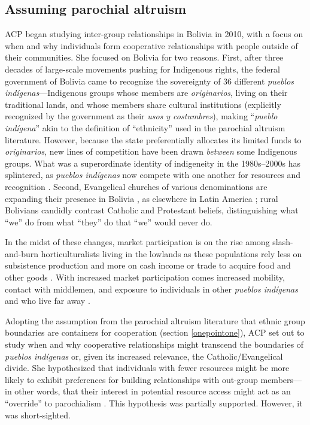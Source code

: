 \documentclass[bibauthoryear]{aa}
\begin{document}
\subsection{Assuming parochial altruism}
ACP began studying inter-group relationships in Bolivia in 2010, with a focus on when and why   individuals form cooperative relationships with people outside of their communities.   She focused on Bolivia for two reasons. First, after three decades of large-scale movements pushing for Indigenous rights, the federal government of Bolivia came to recognize the sovereignty of 36 different  \textit{pueblos ind\'igenas}---Indigenous groups whose members are \textit{originarios}, living on their traditional lands, and whose members share cultural institutions (explicitly recognized by the government as their  \textit{usos y costumbres}), making ``\textit{pueblo ind\'igena}'' akin to the definition of ``ethnicity'' used in the parochial altruism literature. However, because the state preferentially allocates its limited funds to \textit{originarios}, new lines of competition have been drawn \textit{between} some Indigenous groups. What was a superordinate identity of indigeneity in the 1980s--2000s has splintered, as \textit{pueblos ind\'igenas} now compete with one another for resources and recognition \citep{fontana2014indigenous}.
Second, Evangelical churches of various denominations are expanding their presence in Bolivia \citep{lesley1993religious}, as elsewhere in Latin America \citep{stoll1990latin}; rural Bolivians candidly contrast Catholic and Protestant beliefs, distinguishing what ``we'' do from what ``they'' do that ``we'' would never do. 

In the midst of these changes, market participation is on the rise among slash-and-burn horticulturalists living in the lowlands as these populations rely less on subsistence production and more on cash income or trade to acquire food and other goods \citep{gurven2015does, reyes2010integration}. With increased market participation comes increased mobility, contact with middlemen, and exposure to individuals in other \textit{pueblos ind\'igenas} and who live far away \citep{pisorjones2020}.

 Adopting the assumption from the parochial altruism literature that ethnic group boundaries are containers for cooperation (section \ref{onepointone}), ACP set out to study when and why cooperative relationships might transcend the boundaries of \textit{pueblos ind\'igenas} or, given its increased relevance, the Catholic/Evangelical divide. She hypothesized that individuals with fewer resources might be more likely to exhibit preferences for building relationships with out-group members---in other words, that their interest in potential resource access might act as an ``override'' to parochialism \citep{pisor2016risk, pisor2018diversify}. This hypothesis was partially supported. However, it was short-sighted.
\end{document}
